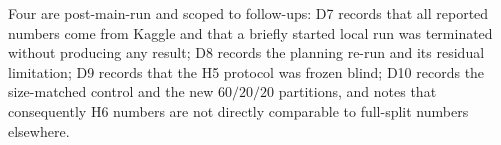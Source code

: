 \documentclass[twocolumn,10pt]{article}
\begin{document}
Four are post-main-run and scoped to follow-ups: D7 records that all reported numbers come from
Kaggle and that a briefly started local run was terminated without producing any result; D8
records the planning re-run and its residual limitation; D9 records that the H5 protocol was
frozen blind; D10 records the size-matched control and the new $60/20/20$ partitions, and notes
that consequently H6 numbers are not directly comparable to full-split numbers elsewhere.



\end{document}
